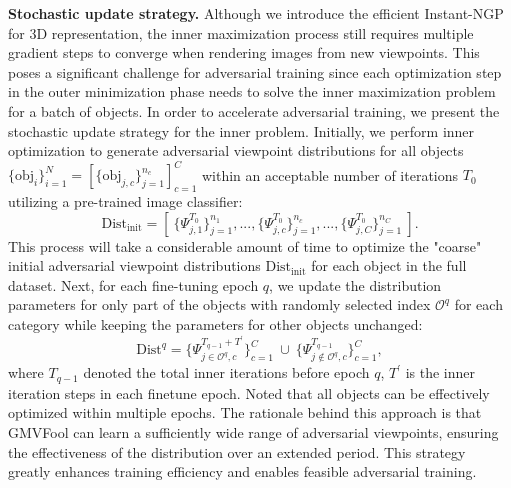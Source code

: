 \documentclass[10pt,journal,compsoc]{IEEEtran}
\begin{document}
\textbf{Stochastic update strategy.}
Although we introduce the efficient Instant-NGP for 3D representation, the inner maximization process still requires multiple gradient steps to converge when rendering images from new viewpoints. This poses a significant challenge for adversarial training since each optimization step in the outer minimization phase needs to solve the inner maximization problem for a batch of objects. In order to accelerate adversarial training, we present the stochastic update strategy for the inner problem. Initially, we perform inner optimization to generate adversarial viewpoint distributions for all objects $\{\text{obj}_i\}_{i=1}^N=[\{\text{obj}_{j,c}\}_{j=1}^{n_c}]_{c=1}^C$ within an acceptable number of iterations $T_0$ utilizing a pre-trained image classifier:
\begin{equation}
\text{Dist}_\text{init}=[~\{\Psi_{j,1}^{T_0} \}_{j=1}^{n_1},...,\{\Psi_{j,c}^{T_0} \}_{j=1}^{n_c},...,\{\Psi_{j,C}^{T_0} \}_{j=1}^{n_C}~].
\label{eq: dist pool}
\end{equation}
This process will take a considerable amount of time to optimize the "coarse" initial adversarial viewpoint distributions $\text{Dist}_\text{init}$ for each object in the full dataset. Next, for each fine-tuning epoch $q$, we update the distribution parameters for only part of the objects with randomly selected index $\mathcal{O}^{q}$ for each category while keeping the parameters for other objects unchanged:
\begin{equation}
\text{Dist}^{q}=\{\Psi_{j\in\mathcal{O}^{q},c}^{T_{q-1}+T^\prime}\}_{c=1}^C ~\cup~ \{\Psi_{j\notin\mathcal{O}^{q},c}^{T_{q-1}}\}_{c=1}^C,
\label{eq: dist pool2}
\end{equation}
where $T_{q-1}$ denoted the total inner iterations before epoch $q$, $T^\prime$ is the inner  iteration steps in each finetune epoch. Noted that all objects can be effectively optimized within multiple epochs. 
The rationale behind this approach is that GMVFool can learn a sufficiently wide range of adversarial viewpoints, ensuring the effectiveness of the distribution over an extended period. This strategy greatly enhances training efficiency and enables feasible adversarial training.
\end{document}
